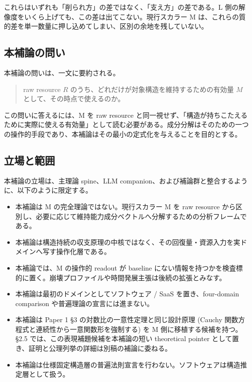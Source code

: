 \documentclass[12pt,a4paper]{article}
\begin{document}
これらはいずれも「削られ方」の差ではなく、「支え方」の差である。L 側の解像度をいくら上げても、この差は出てこない。現行スカラー M は、これらの質的差を単一数量に押し込めてしまい、区別の余地を残していない。

\subsection{本補論の問い}\label{ux672cux88dcux8ad6ux306eux554fux3044}

本補論の問いは、一文に要約される。

\begin{quote}
raw resource $R$ のうち、どれだけが対象構造を維持するための有効量 $M$ として、その時点で使えるのか。
\end{quote}

この問いに答えるには、M を raw resource と同一視せず、「構造が持ちこたえるために実際に使える有効量」として読む必要がある。成分分解はそのための一つの操作的手段であり、本補論はその最小の定式化を与えることを目的とする。

\subsection{立場と範囲}\label{ux7acbux5834ux3068ux7bc4ux56f2}

本補論の立場は、主理論 spine、LLM companion、および補論群と整合するように、以下のように限定する。

\begin{itemize}
\tightlist
\item
  本補論は M の完全理論ではない。現行スカラー M を raw resource から区別し、必要に応じて維持能力成分ベクトルへ分解するための分析フレームである。
\item
  本補論は構造持続の収支原理の中核ではなく、その回復量・資源入力を実ドメインへ写す操作化層である。
\item
  本補論では、M の操作的 readout が baseline にない情報を持つかを検査標的に置く。崩壊プロファイルや時間発展主張は後続の拡張とみなす。
\item
  本補論は最初のドメインとしてソフトウェア / SaaS を置き、four-domain comparison や普遍理論の宣言には進まない。
\item
  本補論は Paper 1 §3 の対数比の一意性定理と同じ設計原理 (Cauchy 関数方程式と連続性から一意関数形を強制する) を M 側に移植する候補を持つ。§2.5 では、この表現補題候補を本補論の短い theoretical pointer として置き、証明と公理列挙の詳細は別稿の補論に委ねる。
\item
  本補論は仕様固定構造層の普遍法則宣言を行わない。ソフトウェアは構造推定層として扱う。
\end{itemize}
\end{document}
